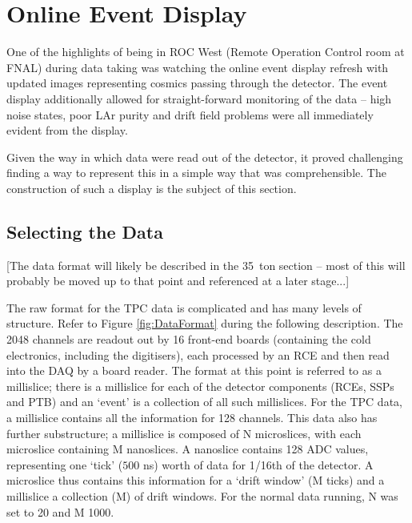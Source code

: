 \section{Online Event Display}\label{sec:EventDisplay}

One of the highlights of being in ROC West (Remote Operation Control room at FNAL) during data taking was watching the online event display refresh with updated images representing cosmics passing through the detector.  The event display additionally allowed for straight-forward monitoring of the data -- high noise states, poor LAr purity and drift field problems were all immediately evident from the display.

Given the way in which data were read out of the detector, it proved challenging finding a way to represent this in a simple way that was comprehensible.  The construction of such a display is the subject of this section.

\subsection{Selecting the Data}\label{sec:SelectingEVDData}

[The data format will likely be described in the 35~ton section -- most of this will probably be moved up to that point and referenced at a later stage...]

The raw format for the TPC data is complicated and has many levels of structure.  Refer to Figure \ref{fig:DataFormat} during the following description.  The 2048 channels are readout out by 16 front-end boards (containing the cold electronics, including the digitisers), each processed by an RCE and then read into the DAQ by a board reader.  The format at this point is referred to as a millislice; there is a millislice for each of the detector components (RCEs, SSPs and PTB) and an `event' is a collection of all such millislices.  For the TPC data, a millislice contains all the information for 128 channels.  This data also has further substructure; a millislice is composed of N microslices, with each microslice containing M nanoslices.  A nanoslice contains 128 ADC values, representing one `tick' ($500$ ns) worth of data for 1/16th of the detector.  A microslice thus contains this information for a `drift window' (M ticks) and a millislice a collection (M) of drift windows.  For the normal data running, N was set to 20 and M 1000.

